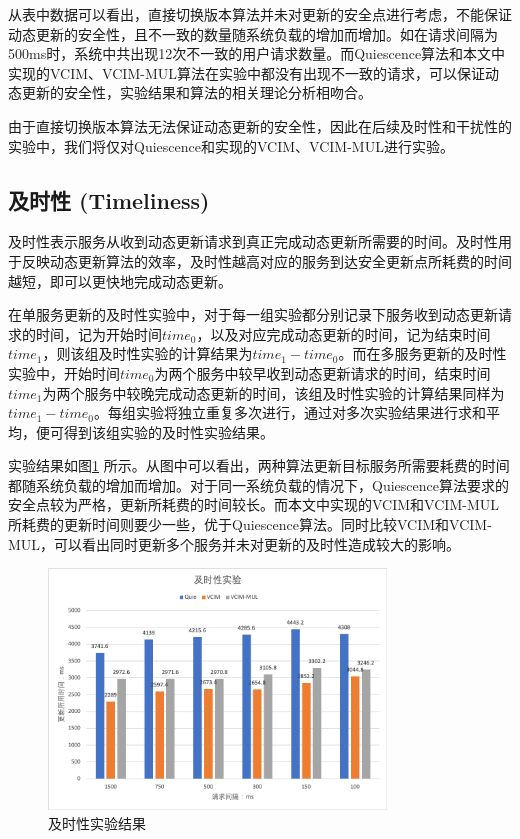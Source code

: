 \documentclass[macfonts,master]{njuthesis}
\begin{document}
从表中数据可以看出，直接切换版本算法并未对更新的安全点进行考虑，不能保证动态更新的安全性，且不一致的数量随系统负载的增加而增加。如在请求间隔为500ms时，系统中共出现12次不一致的用户请求数量。而Quiescence算法和本文中实现的VCIM、VCIM-MUL算法在实验中都没有出现不一致的请求，可以保证动态更新的安全性，实验结果和算法的相关理论分析相吻合。

由于直接切换版本算法无法保证动态更新的安全性，因此在后续及时性和干扰性的实验中，我们将仅对Quiescence和实现的VCIM、VCIM-MUL进行实验。

\subsection{及时性 (Timeliness) }
及时性表示服务从收到动态更新请求到真正完成动态更新所需要的时间。及时性用于反映动态更新算法的效率，及时性越高对应的服务到达安全更新点所耗费的时间越短，即可以更快地完成动态更新。

在单服务更新的及时性实验中，对于每一组实验都分别记录下服务收到动态更新请求的时间，记为开始时间$time_0$，以及对应完成动态更新的时间，记为结束时间$time_1$，则该组及时性实验的计算结果为$time_1 - time_0$。而在多服务更新的及时性实验中，开始时间$time_0$为两个服务中较早收到动态更新请求的时间，结束时间$time_1$为两个服务中较晚完成动态更新的时间，该组及时性实验的计算结果同样为$time_1 - time_0$。每组实验将独立重复多次进行，通过对多次实验结果进行求和平均，便可得到该组实验的及时性实验结果。

实验结果如图\ref{fig:timeliness} 所示。从图中可以看出，两种算法更新目标服务所需要耗费的时间都随系统负载的增加而增加。对于同一系统负载的情况下，Quiescence算法要求的安全点较为严格，更新所耗费的时间较长。而本文中实现的VCIM和VCIM-MUL所耗费的更新时间则要少一些，优于Quiescence算法。同时比较VCIM和VCIM-MUL，可以看出同时更新多个服务并未对更新的及时性造成较大的影响。

\begin{figure}[!htbp]
  \centering
  \includegraphics[width= 0.8\textwidth]{image/timeliness.png}
  \caption{及时性实验结果}
  \label{fig:timeliness}
\end{figure}
\end{document}
